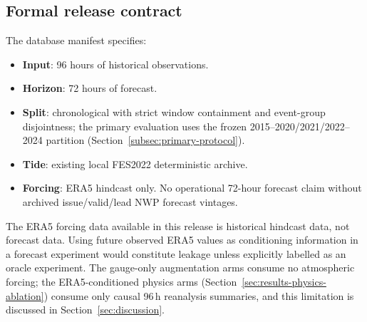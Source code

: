 \subsection{Formal release contract}
The database manifest specifies:
\begin{itemize}
    \item \textbf{Input}: 96 hours of historical observations.
    \item \textbf{Horizon}: 72 hours of forecast.
    \item \textbf{Split}: chronological with strict window containment and
    event-group disjointness; the primary evaluation uses the frozen
    2015--2020/2021/2022--2024 partition
    (Section~\ref{subsec:primary-protocol}).
    \item \textbf{Tide}: existing local FES2022 deterministic archive.
    \item \textbf{Forcing}: ERA5 hindcast only. No operational 72-hour forecast
    claim without archived issue/valid/lead NWP forecast vintages.
\end{itemize}
The ERA5 forcing data available in this release is historical hindcast data, not
forecast data. Using future observed ERA5 values as conditioning information in
a forecast experiment would constitute leakage unless explicitly labelled as an
oracle experiment. The gauge-only augmentation arms consume no atmospheric
forcing; the ERA5-conditioned physics arms (Section~\ref{sec:results-physics-ablation})
consume only causal 96\,h reanalysis summaries, and this limitation is discussed
in Section~\ref{sec:discussion}.
